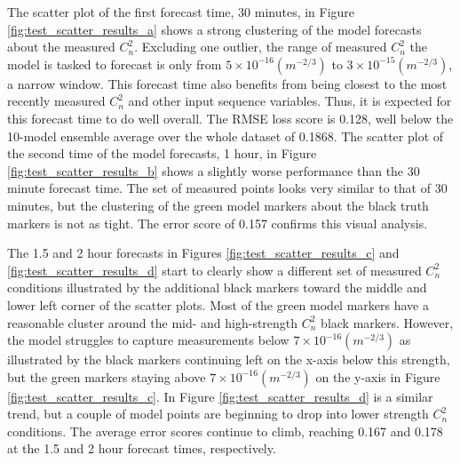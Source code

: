 The scatter plot of the first forecast time, 30 minutes, in Figure \ref{fig:test_scatter_results_a} shows a strong clustering of the model forecasts about the measured $C_{n}^{2}$. Excluding one outlier, the range of measured $C_{n}^{2}$ the model is tasked to forecast is only from $5 \times 10^{-16} (m^{-2/3})$ to $3 \times 10^{-15} (m^{-2/3})$, a narrow window. This forecast time also benefits from being closest to the most recently measured $C_{n}^{2}$ and other input sequence variables. Thus, it is expected for this forecast time to do well overall. The RMSE loss score is 0.128, well below the 10-model ensemble average over the whole dataset of 0.1868. The scatter plot of the second time of the model forecasts, 1 hour, in Figure \ref{fig:test_scatter_results_b} shows a slightly worse performance than the 30 minute forecast time. The set of measured points looks very similar to that of 30 minutes, but the clustering of the green model markers about the black truth markers is not as tight. The error score of 0.157 confirms this visual analysis.

The 1.5 and 2 hour forecasts in Figures \ref{fig:test_scatter_results_c} and \ref{fig:test_scatter_results_d} start to clearly show a different set of measured $C_{n}^{2}$ conditions illustrated by the additional black markers toward the middle and lower left corner of the scatter plots. Most of the green model markers have a reasonable cluster around the mid- and high-strength $C_{n}^{2}$ black markers. However, the model struggles to capture measurements below $7 \times 10^{-16} (m^{-2/3})$ as illustrated by the black markers continuing left on the x-axis below this strength, but the green markers staying above $7 \times 10^{-16} (m^{-2/3})$ on the y-axis in Figure \ref{fig:test_scatter_results_c}. In Figure \ref{fig:test_scatter_results_d} is a similar trend, but a couple of model points are beginning to drop into lower strength $C_{n}^{2}$ conditions. The average error scores continue to climb, reaching 0.167 and 0.178 at the 1.5 and 2 hour forecast times, respectively.

